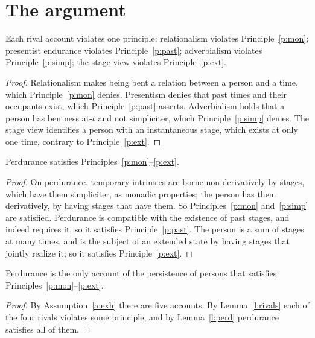 \documentclass{situationist-preprint}
\begin{document}
\section{The argument}\label{s:arg}

\begin{lemma}\label{l:rivals}
Each rival account violates one principle: relationalism violates Principle~\ref{p:mon}; presentist endurance violates Principle~\ref{p:past}; adverbialism violates Principle~\ref{p:simp}; the stage view violates Principle~\ref{p:ext}.
\end{lemma}

\begin{proof}
Relationalism makes being bent a relation between a person and a time, which Principle~\ref{p:mon} denies. Presentism denies that past times and their occupants exist, which Principle~\ref{p:past} asserts. Adverbialism holds that a person has bentness at-$t$ and not simpliciter, which Principle~\ref{p:simp} denies. The stage view identifies a person with an instantaneous stage, which exists at only one time, contrary to Principle~\ref{p:ext}.
\end{proof}

\begin{lemma}\label{l:perd}
Perdurance satisfies Principles~\ref{p:mon}--\ref{p:ext}.
\end{lemma}

\begin{proof}
On perdurance, temporary intrinsics are borne non-derivatively by stages, which have them simpliciter, as monadic properties; the person has them derivatively, by having stages that have them. So Principles~\ref{p:mon} and~\ref{p:simp} are satisfied. Perdurance is compatible with the existence of past stages, and indeed requires it, so it satisfies Principle~\ref{p:past}. The person is a sum of stages at many times, and is the subject of an extended state by having stages that jointly realize it; so it satisfies Principle~\ref{p:ext}.
\end{proof}

\begin{theorem}\label{t:unique}
Perdurance is the only account of the persistence of persons that satisfies Principles~\ref{p:mon}--\ref{p:ext}.
\end{theorem}

\begin{proof}
By Assumption~\ref{a:exh} there are five accounts. By Lemma~\ref{l:rivals} each of the four rivals violates some principle, and by Lemma~\ref{l:perd} perdurance satisfies all of them.
\end{proof}
\end{document}

